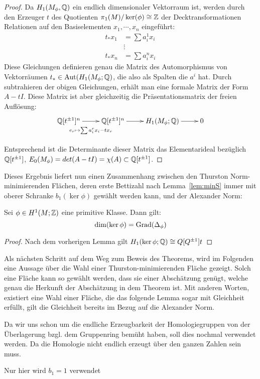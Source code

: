 \begin{proof}
	Da $H_1(M_\phi,\mathbb{Q})$ ein endlich dimensionaler Vektorraum ist, werden durch den Erzeuger $t$ des Quotienten $\pi_1(M)/\ker(\phi) \cong \mathbb{Z}$ der Decktransformationen Relationen auf den Basiselementen $x_1,\cdots,x_n$ eingeführt:	
	\begin{align*}
		t_*x_1 &= \sum a_i^1 x_i \\
				&\vdots \\
		t_*x_n &= \sum a_i^n x_i
	\end{align*}
	Diese Gleichungen definieren genau die Matrix des Automorphismus von Vektorräumen $t_* \in \operatorname{Aut} (H_1(M_\phi;\mathbb{Q})$, die also als Spalten die $a^i$ hat. Durch subtrahieren der obigen Gleichungen, erhält man eine formale Matrix der Form $A-tI$. Diese Matrix ist aber gleichzeitig die Präsentationsmatrix der freien Auflösung:
	\[
		\begin{xy}
			\xymatrix@L+5pt{\laurent \QQ t ^n \ar[r]_{e_r\mapsto \sum a_i^rx_i-tx_r} & \laurent \QQ t ^n \ar[r] & H_1(M_\phi;\QQ) \ar[r] &0\\}
		\end{xy}
	\]
	Entsprechend ist die Determinante dieser Matrix das Elementarideal bezüglich $\mathbb{Q}[t^{\pm 1}]$, $E_0(M_\phi)=det(A-tI)=\chi(A) \subset \mathbb{Q}[t^{\pm 1}] $. 
\end{proof}

Dieses Ergebnis liefert nun einen Zusammenhang zwischen den Thurston Norm-minimierenden Flächen, deren erste Bettizahl nach Lemma~\ref{lem:minS} immer mit oberer Schranke $b_1(\ker\phi)$ gewählt werden kann, und der Alexander Norm:
\begin{cor}
	Sei $\phi \in H^1(M;\mathbb{Z})$ eine primitive Klasse. Dann gilt:
	\[
		\dim(\ker\phi) = \operatorname{Grad}(\Delta_\phi) 
	\]
\end{cor}
\begin{proof}
	Nach dem vorherigen Lemma gilt $H_1(\ker \phi;\mathbb{Q}) \cong Q[Q^{\pm 1}] t$ 
\end{proof}




Als nächsten Schritt auf dem Weg zum Beweis des Theorems, wird im Folgenden eine Aussage über die Wahl einer Thurston-minimierenden Fläche gezeigt. Solch eine Fläche kann so gewählt werden, dass sie einer Abschätzung genügt, welche genau die Herkunft der Abschätzung in dem Theorem ist. Mit anderen Worten, existiert eine Wahl einer Fläche, die das folgende Lemma sogar mit Gleichheit erfüllt, gilt die Gleichheit bereits im Bezug auf die Alexander Norm.


Da wir uns schon um die endliche Erzeugbarkeit der Homologiegruppen von der Überlagerung bzgl. dem Gruppenring bemüht haben, soll dies nochmal verwendet werden. Da die Homologie nicht endlich erzeugt über den ganzen Zahlen sein muss.


Nur hier wird $b_1=1$ verwendet
    